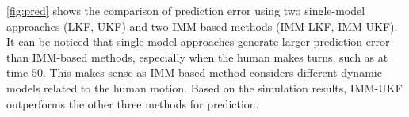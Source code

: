 \documentclass[letterpaper, 10 pt, conference]{ieeeconf}
\begin{document}
	\cref{fig:pred} shows the comparison of prediction error using two single-model approaches (LKF, UKF) and two IMM-based methods (IMM-LKF, IMM-UKF).
	It can be noticed that single-model approaches generate larger prediction error than IMM-based methods, especially when the human makes turns,  such as at time $50$.
	This makes sense as IMM-based method considers different dynamic models related to the human motion.
	Based on the simulation results, IMM-UKF outperforms the other three methods for prediction.
	
\end{document}
